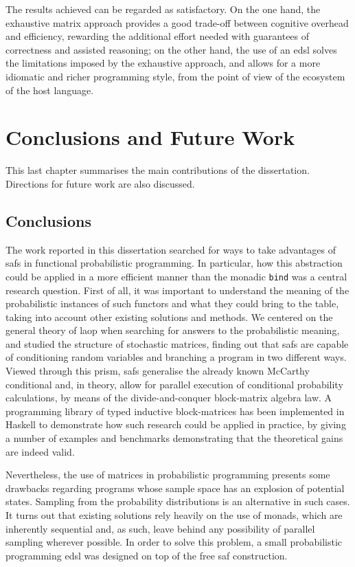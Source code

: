 \documentclass[
  oneside,
  11pt, a4paper,
  footinclude=true,
  headinclude=true,
  cleardoublepage=empty
]{scrbook}
\theoremstyle{definition}
\theoremstyle{definition}
\begin{document}
    The results achieved can be regarded as satisfactory. On the one hand, the exhaustive matrix approach provides a good trade-off between cognitive overhead and efficiency, rewarding the additional effort needed with guarantees of correctness and assisted reasoning; on the other hand, the use of an \gls{edsl} solves the limitations imposed by the exhaustive approach, and allows for a more idiomatic and richer programming style, from the point of view of the ecosystem of the host language.
    
	\chapter{Conclusions and Future Work}\label{ch-conclusion}
	    This last chapter summarises the main  contributions of the dissertation. Directions for future work are also discussed.
	
	    \section{Conclusions}
	        The work reported in this dissertation searched for ways to take advantages of \glspl{saf} in functional probabilistic programming. In particular, how this abstraction could be applied in a more efficient manner than the monadic \texttt{bind} was a central research question. First of all, it was important to understand the meaning of the probabilistic instances of such functors and what they could bring to the table, taking into account other existing solutions and methods.
	        We centered on the general theory of \gls{laop} when searching for answers to the probabilistic meaning, and studied the structure of stochastic matrices, finding out that \glspl{saf} are capable of conditioning random variables and branching a program in two different ways. Viewed through this prism, \glspl{saf} generalise the already known McCarthy conditional and, in theory, allow for parallel execution of conditional probability calculations, by means of the divide-and-conquer block-matrix algebra law. A programming library of typed inductive block-matrices has been implemented in Haskell to demonstrate how such research could be applied in practice, by giving a number of examples and benchmarks demonstrating that the theoretical gains are indeed valid. 
	        
	        Nevertheless, the use of matrices in probabilistic programming presents some drawbacks regarding programs whose sample space has an explosion of potential states. Sampling from the probability distributions is an alternative in such cases. It turns out that existing solutions rely heavily on the use of monads, which are inherently sequential and, as such, leave behind any possibility of parallel sampling wherever possible. In order to solve this problem, a small probabilistic programming \gls{edsl} was designed on top of the free \gls{saf} construction.
	        
\end{document}
